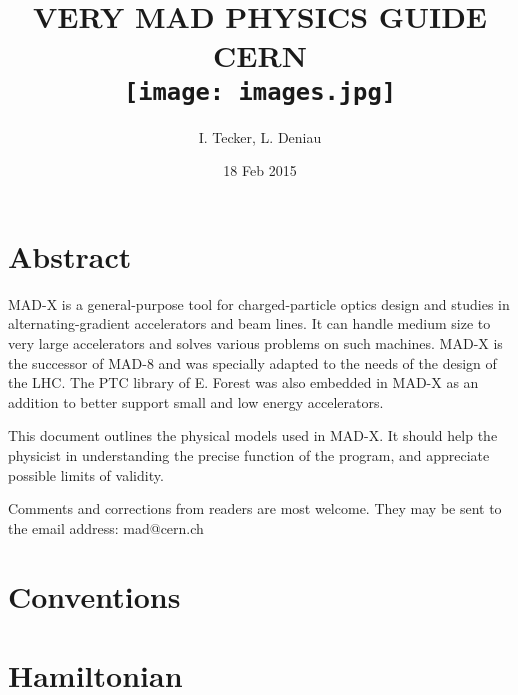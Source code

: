 \documentclass[12pt]{report}
\begin{document}


\title{
	{VERY MAD PHYSICS GUIDE}\\
	{\large CERN}\\
	{\texttt{[image: images.jpg]}}
}
\author{I. Tecker, L. Deniau}
\date{18 Feb 2015}
\maketitle
\thispagestyle{empty}


\chapter*{Abstract}
\par
MAD-X is a general-purpose tool for charged-particle optics design and studies in alternating-gradient accelerators and beam lines. It can handle medium size to very large accelerators and solves various problems on such machines. MAD-X is the successor of MAD-8 and was specially adapted to the needs of the design of the LHC. The PTC library of E. Forest was also embedded in MAD-X as an addition to better support small and low energy accelerators. 
\par
This document outlines the physical models used in MAD-X. It should help the physicist in understanding the precise function of the program, and appreciate possible limits of validity. 
\par
Comments and corrections from readers are most welcome. They may be sent to the email address: mad@cern.ch

\thispagestyle{empty}


\newpage
{}
\tableofcontents


\clearpage
\newpage
{}

\chapter{Conventions}

\chapter{Hamiltonian}


\clearpage


%
\end{document}
